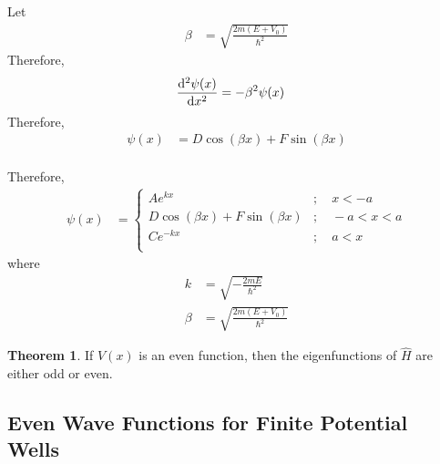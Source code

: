 \documentclass[titlepage, fleqn, a4paper, 12pt, twoside]{article}
\theoremstyle{definition}
\theoremstyle{theorem}
\newtheorem{theorem}{Theorem}
\let\Oldsubsection\subsection
\renewcommand{\subsection}{\FloatBarrier\Oldsubsection}
\begin{document}
Let
\begin{align*}
	\beta &= \sqrt{\frac{2 m (E + V_0)}{\hbar^2}}
\end{align*}
Therefore,
\begin{align*}
	\dod[2]{\psi(x)}{x} &= -\beta^2 \psi(x)
\end{align*}
Therefore,
\begin{align*}
	\psi(x) &= D \cos(\beta x) + F \sin(\beta x)
\end{align*}
~\\
Therefore,
\begin{align*}
	\psi(x) &=
		\begin{cases}
			A e^{k x} &;\quad x < -a\\
			D \cos(\beta x) + F \sin(\beta x) &;\quad -a < x < a\\
			C e^{-k x} &;\quad a < x\\
		\end{cases}
\end{align*}
where
\begin{align*}
	k &= \sqrt{-\frac{2 m E}{\hbar^2}}\\
	\beta &= \sqrt{\frac{2 m (E + V_0)}{\hbar^2}}
\end{align*}

\begin{theorem}
	If $V(x)$ is an even function, then the eigenfunctions of $\hat{H}$ are either odd or even.
\end{theorem}

\subsection{Even Wave Functions for Finite Potential Wells}
\end{document}
